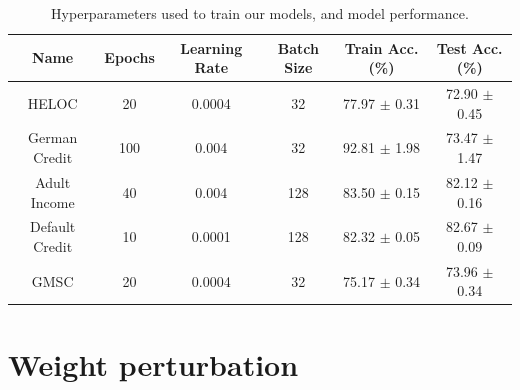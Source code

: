 \begin{table}[t]
\caption{\small Hyperparameters used to train our models, and model performance.}
\label{tab:appmodels}
\centering
\begin{tabular}{cccccc}
\toprule
Name & Epochs & Learning Rate & Batch Size & Train Acc. (\%) & Test Acc. (\%)\\
\toprule
\midrule
HELOC & 20 & 0.0004 & 32 & 77.97 $\pm$ 0.31 & 72.90 $\pm$ 0.45\\
\midrule
German Credit & 100 & 0.004 & 32 & 92.81 $\pm$ 1.98 & 73.47 $\pm$ 1.47\\
\midrule
Adult Income & 40 & 0.004 & 128 & 83.50 $\pm$ 0.15 & 82.12 $\pm$ 0.16\\
\midrule
Default Credit & 10 & 0.0001 & 128 & 82.32 $\pm$ 0.05 & 82.67 $\pm$ 0.09\\
\midrule
GMSC & 20 & 0.0004 & 32 & 75.17 $\pm$ 0.34 & 73.96 $\pm$ 0.34\\
\bottomrule
\end{tabular}
\end{table}


\section{Weight perturbation}
\label{app:weights}

